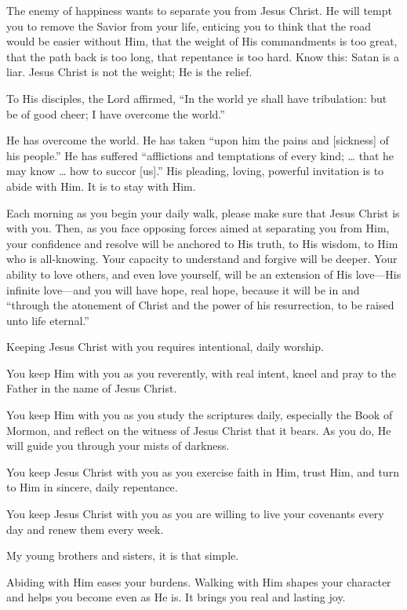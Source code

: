 \documentclass[letterpaper, 11pt]{report}
\newcommand{\intalkheader}[1]{
    \vspace{0.75em}
    \noindent{\normalsize\bfseries #1}
    \par\nopagebreak %
    \vspace{0.25em}
    \nopagebreak     %
}
\begin{document}
The enemy of happiness wants to separate you from Jesus Christ. He will tempt you to remove the Savior from your life, enticing you to think that the road would be easier without Him, that the weight of His commandments is too great, that the path back is too long, that repentance is too hard. Know this: Satan is a liar. Jesus Christ is not the weight; He is the relief.

To His disciples, the Lord affirmed, “In the world ye shall have tribulation: but be of good cheer; I have overcome the world.”

He has overcome the world. He has taken “upon him the pains and [sickness] of his people.” He has suffered “afflictions and temptations of every kind; … that he may know … how to succor [us].” His pleading, loving, powerful invitation is to abide with Him. It is to stay with Him.

\intalkheader{Abide with Him; Walk with Him}

Each morning as you begin your daily walk, please make sure that Jesus Christ is with you. Then, as you face opposing forces aimed at separating you from Him, your confidence and resolve will be anchored to His truth, to His wisdom, to Him who is all-knowing. Your capacity to understand and forgive will be deeper. Your ability to love others, and even love yourself, will be an extension of His love—His infinite love—and you will have hope, real hope, because it will be in and “through the atonement of Christ and the power of his resurrection, to be raised unto life eternal⁠.”

Keeping Jesus Christ with you requires intentional, daily worship.

You keep Him with you as you reverently, with real intent, kneel and pray to the Father in the name of Jesus Christ.

You keep Him with you as you study the scriptures daily, especially the Book of Mormon, and reflect on the witness of Jesus Christ that it bears. As you do, He will guide you through your mists of darkness.

You keep Jesus Christ with you as you exercise faith in Him, trust Him, and turn to Him in sincere, daily repentance.

You keep Jesus Christ with you as you are willing to live your covenants every day and renew them every week.

My young brothers and sisters, it is that simple.

Abiding with Him eases your burdens. Walking with Him shapes your character and helps you become even as He is. It brings you real and lasting joy.
\end{document}
